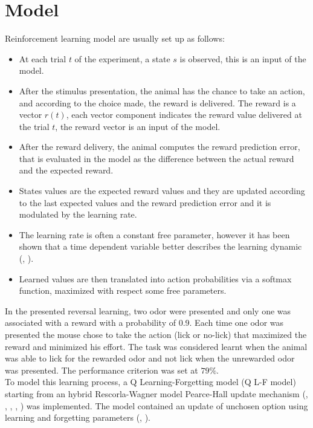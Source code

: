 \section{Model}
\label{sec:Model}
Reinforcement learning model are usually set up as follows:
\begin{itemize}
    \item At each trial $t$ of the experiment, a state $s$ is observed, this is an input of the model.
    \item After the stimulus presentation, the animal has the chance to take an action, and according to the choice made, the reward is delivered. The reward is a vector $r(t)$, each vector component indicates the reward value delivered at the trial $t$, the reward vector is an input of the model.
    \item After the reward delivery, the animal computes the reward prediction error, that is evaluated in the model as the difference between the actual reward and the expected reward.
    \item States values are the expected reward values and they are updated according to the last expected values and the reward prediction error and it is modulated by the learning rate.
    \item The learning rate is often a constant free parameter, however it has been shown that a time dependent variable better describes the learning dynamic (\cite{Funamizu}, \cite{Daw}).
    \item Learned values are then translated into action probabilities via a softmax function, maximized with respect some free parameters.
\end{itemize}
In the presented reversal learning, two odor were presented and only one was associated with a reward with a probability of 0.9. Each time one odor was presented the mouse chose to take the action (lick or no-lick) that maximized the reward and minimized his effort. The task was considered learnt when the animal was able to lick for the rewarded odor and not lick when the unrewarded odor was presented. The performance criterion was set at $79\%$.\\To model this learning process, a Q Learning-Forgetting model (Q L-F model) starting from an hybrid Rescorla-Wagner model Pearce-Hall update mechanism (\cite{RescorlaWagner}, \cite{PearceHall}, \cite{Li}, \cite{Costa}, \cite{Koppe}) was implemented. The model contained an update of unchosen option using learning and forgetting parameters (\cite{ItoDoya1}, \cite{Katahira}).
